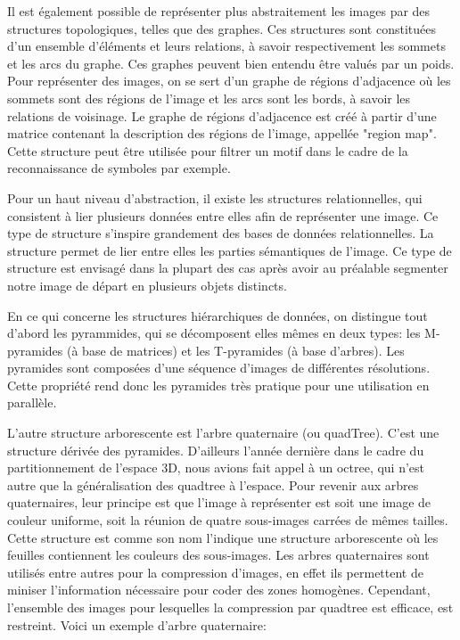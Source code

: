 \documentclass[]{report}
\begin{document}
      Il est également possible de représenter plus abstraitement les images par des structures topologiques, telles que des graphes. Ces structures sont constituées d'un ensemble d'éléments et leurs relations, à savoir respectivement les sommets et les arcs du graphe. Ces graphes peuvent bien entendu être valués par un poids. Pour représenter des images, on se sert d'un graphe de régions d'adjacence où les sommets sont des régions de l'image et les arcs sont les bords, à savoir les relations de voisinage. Le graphe de régions d'adjacence est créé à partir d'une matrice contenant la description des régions de l'image, appellée "region map". Cette structure peut être utilisée pour filtrer un motif dans le cadre de la reconnaissance de symboles par exemple.
    

      Pour un haut niveau d'abstraction, il existe les structures relationnelles, qui consistent à lier plusieurs données entre elles afin de représenter une image. Ce type de structure s'inspire grandement des bases de données relationnelles. La structure permet de lier entre elles les parties sémantiques de l'image. Ce type de structure est envisagé dans la plupart des cas après avoir au préalable segmenter notre image de départ en plusieurs objets distincts.

      
      En ce qui concerne les structures hiérarchiques de données, on distingue tout d'abord les pyrammides, qui se décomposent elles mêmes en deux types: les M-pyramides (à base de matrices) et les T-pyramides (à base d'arbres). Les pyramides sont composées d'une séquence d'images de différentes résolutions. Cette propriété rend donc les pyramides très pratique pour une utilisation en parallèle.

      L'autre structure arborescente est l'arbre quaternaire (ou quadTree). C'est une structure dérivée des pyramides. D'ailleurs l'année dernière dans le cadre du partitionnement de l'espace 3D, nous avions fait appel à un octree, qui n'est autre que la généralisation des quadtree à l'espace. Pour revenir aux arbres quaternaires, leur principe est que l'image à représenter est soit une image de couleur uniforme, soit la réunion de quatre sous-images carrées de mêmes tailles. Cette structure est comme son nom l'indique une structure arborescente où les feuilles contiennent les couleurs des sous-images. Les arbres quaternaires sont utilisés entre autres pour la compression d'images, en effet ils permettent de miniser l'information nécessaire pour coder des zones homogènes. Cependant, l'ensemble des images pour lesquelles la compression par quadtree est efficace, est restreint. Voici un exemple d'arbre quaternaire:
      
\end{document}

